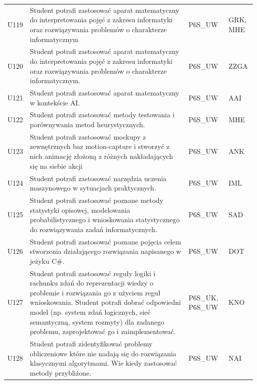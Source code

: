 \documentclass[12pt,a4paper]{article}
\begin{document}
{\begin{longtable}{m{1cm}m{8.8cm}m{2.1cm}m{2.5cm}}
\rowcolor{tableRowLight} U119 & Student potrafi zastosować aparat matematyczny do interpretowania pojęć z zakresu informatyki oraz rozwiązywania problemów o charakterze informatycznym & {\scriptsize P6S\_UW} & {\scriptsize GRK, MHE} \\
\rowcolor{tableRowAlt} U120 & Student potrafi zastosować aparat matematyczny do interpretowania pojęć z zakresu informatyki oraz rozwiązywania problemów o charakterze informatycznym. & {\scriptsize P6S\_UW} & {\scriptsize ZZGA} \\
\rowcolor{tableRowLight} U121 & Student potrafi zastosować aparat matematyczny w kontekście AI. & {\scriptsize P6S\_UW} & {\scriptsize AAI} \\
\rowcolor{tableRowAlt} U122 & Student potrafi zastosować metody testowania i porównywania metod heurystycznych. & {\scriptsize P6S\_UW} & {\scriptsize MHE} \\
\rowcolor{tableRowLight} U123 & Student potrafi zastosować mockupy z zewnętrznych baz motion-capture i stworzyć z nich animację złożoną z różnych nakładających się na siebie akcji & {\scriptsize P6S\_UW} & {\scriptsize ANK} \\
\rowcolor{tableRowAlt} U124 & Student potrafi zastosować narzędzia uczenia maszynowego w sytuacjach praktycznych. & {\scriptsize P6S\_UW} & {\scriptsize IML} \\
\rowcolor{tableRowLight} U125 & Student potrafi zastosować poznane metody statystyki opisowej, modelowania probabilistycznego i wnioskowania statystycznego do rozwiązywania zadań informatycznych. & {\scriptsize P6S\_UW} & {\scriptsize SAD} \\
\rowcolor{tableRowAlt} U126 & Student potrafi zastosować poznane pojęcia celem stworzenia działającego rozwiązania napisanego w jeżyku C\#. & {\scriptsize P6S\_UW} & {\scriptsize DOT} \\
\rowcolor{tableRowLight} U127 & Student potrafi zastosować reguły logiki i rachunku zdań do reprezentacji wiedzy o problemie i rozwiązania go z użyciem reguł wnioskowania. Student potrafi dobrać odpowiedni model (np. system zdań logicznych, sieć semantyczną, system rozmyty) dla zadanego problemu, zaprojektować go i zaimplementować. & {\scriptsize P6S\_UK, P6S\_UW} & {\scriptsize KNO} \\
\rowcolor{tableRowAlt} U128 & Student potrafi zidentyfikować problemy obliczeniowe które nie nadają się do rozwiązania klasycznymi algorytmami. Wie kiedy zastosować metody przybliżone. & {\scriptsize P6S\_UW} & {\scriptsize NAI} \\

\end{longtable}}
\end{document}
